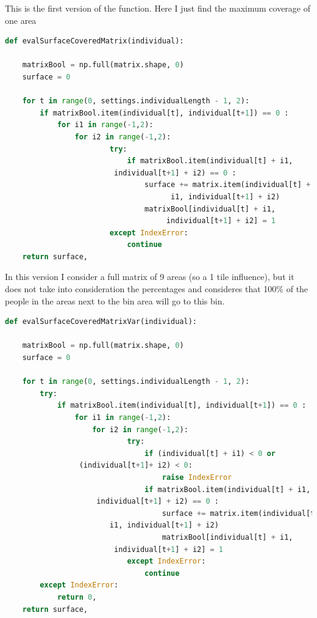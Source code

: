 \documentclass[a4paper,12pt]{report}
\begin{document}
This is the first version of the function. Here I just find the maximum coverage of one area

\begin{lstlisting}[language=Python]
def evalSurfaceCoveredMatrix(individual):
    
    matrixBool = np.full(matrix.shape, 0)
    surface = 0
    
    for t in range(0, settings.individualLength - 1, 2):
        if matrixBool.item(individual[t], individual[t+1]) == 0 :
            for i1 in range(-1,2):
                for i2 in range(-1,2):
                        try:
                            if matrixBool.item(individual[t] + i1,
		          		 individual[t+1] + i2) == 0 :
                                surface += matrix.item(individual[t] + 
                              		  i1, individual[t+1] + i2)
                                matrixBool[individual[t] + i1, 
                               		 individual[t+1] + i2] = 1
                        except IndexError:
                            continue 
    return surface,
\end{lstlisting}

In this version I consider a full matrix of 9 areas (so a 1 tile influence), but it does not take into consideration the percentages and consideres that 100\% of the people in the areas next to the bin area will go to this bin.

\begin{lstlisting}[language=Python]
def evalSurfaceCoveredMatrixVar(individual):
    
    matrixBool = np.full(matrix.shape, 0)
    surface = 0
    
    for t in range(0, settings.individualLength - 1, 2):
        try:
            if matrixBool.item(individual[t], individual[t+1]) == 0 :
                for i1 in range(-1,2):
                    for i2 in range(-1,2):
                            try:
                                if (individual[t] + i1) < 0 or
				 (individual[t+1]+ i2) < 0:
                                    raise IndexError
                                if matrixBool.item(individual[t] + i1,
					 individual[t+1] + i2) == 0 :
                                    surface += matrix.item(individual[t] +
						i1, individual[t+1] + i2)
                                    matrixBool[individual[t] + i1,
						 individual[t+1] + i2] = 1
                            except IndexError:
                                continue 
        except IndexError:
            return 0, 
    return surface,
\end{lstlisting}
\end{document}

